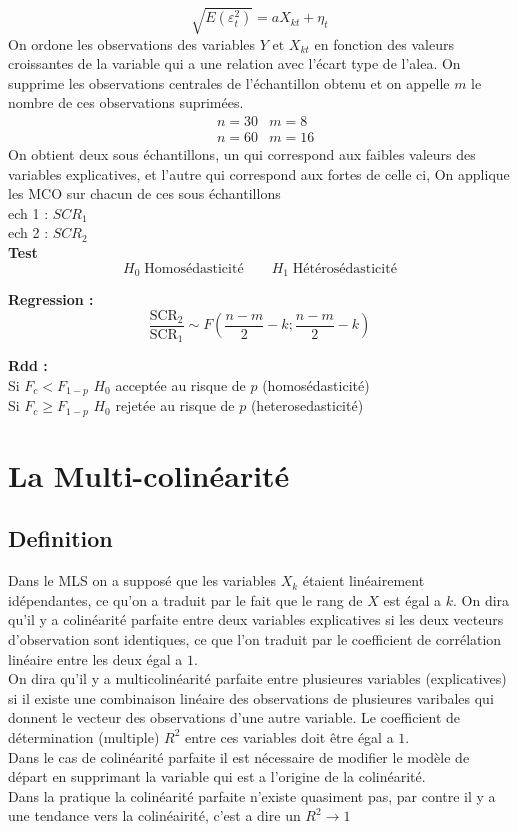 \documentclass{article}
\begin{document}
\begin{equation*}
    \sqrt{E(\varepsilon_t^2)} = a X_{kt} + \eta_t
\end{equation*}
On ordone les observations des variables $Y \text{ et } X_{kt}$ en fonction des valeurs croissantes de la
variable qui a une relation avec l'écart type de l'alea. On supprime les observations
centrales de l'échantillon obtenu et on appelle $m$ le nombre de ces observations suprimées.
\begin{align*}
    &n =30  &m=8 \\
    &n =60  &m=16
\end{align*}
On obtient deux sous échantillons, un qui correspond aux faibles valeurs des variables
explicatives, et l'autre qui correspond aux fortes de celle ci, On applique les MCO sur chacun
de ces sous échantillons \\
ech 1 : $SCR_1$ \\
ech 2 : $SCR_2$ \\
\textbf{Test}
\begin{equation*}
    H_0 \; \text{Homosédasticité} \qquad H_1 \; \text{Hétérosédasticité}
\end{equation*}

\textbf{Regression :}
\begin{equation*}
    \frac{\text{SCR}_2}{\text{SCR}_1} \sim F \left( \frac{n-m}{2}-k ; \frac{n-m}{2}-k\right)  
\end{equation*}

\textbf{Rdd :} \\
Si $F_c < F_{1-p} $ $H_0$ acceptée au risque de $p$ (homosédasticité) \\
Si $F_c \ge  F_{1-p} $ $H_0$ rejetée au risque de $p$ (heterosedasticité) \\

\section{La Multi-colinéarité}
\subsection{Definition}
Dans le MLS on a supposé que les variables $X_{k}$ étaient linéairement idépendantes, ce qu'on a
traduit par le fait que le rang de $X$ est égal a $k$. On dira qu'il y a colinéarité parfaite
entre deux variables explicatives si les deux vecteurs d'observation sont identiques, ce que
l'on traduit par le coefficient de corrélation linéaire entre les deux égal a $1$.\\ On dira qu'il
y a multicolinéarité parfaite entre plusieures variables (explicatives) si il existe une
combinaison linéaire des observations de plusieures varibales qui donnent le vecteur des
observations d'une autre variable. Le coefficient de détermination (multiple) $R^2$ entre ces variables
doit être égal a $1$. \\
Dans le cas de colinéarité parfaite il est nécessaire de modifier le modèle de départ en
supprimant la variable qui est a l'origine de la colinéarité. \\
Dans la pratique la colinéarité parfaite n'existe quasiment pas, par contre il y a une
tendance vers la colinéairité, c'est a dire un $R^2 \rightarrow 1$
\end{document}
